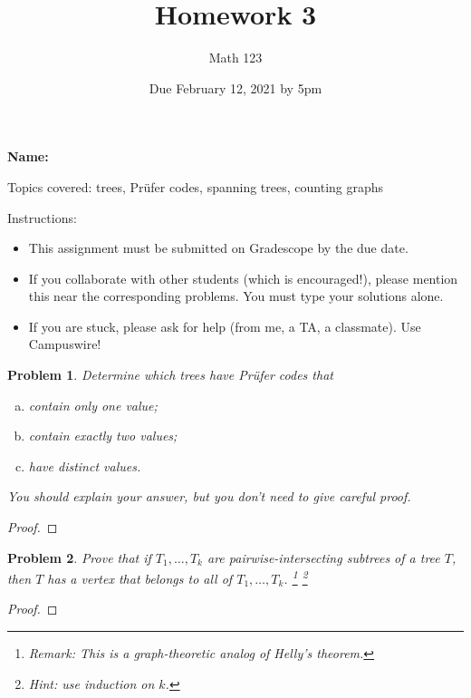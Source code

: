 \documentclass[11pt]{article}
\author{Math 123}
\date{Due February 12, 2021 by 5pm}
\title{Homework 3}
\newtheorem{problem}{Problem}
\begin{document}
\maketitle

{\bf\Large Name:} 


\vspace{.3in}
Topics covered: trees, Pr\"ufer codes, spanning trees, counting graphs

Instructions: 
\begin{itemize}
\item This assignment must be submitted on Gradescope by the due date. 
\item If you collaborate with other students (which is encouraged!), please mention this near the corresponding problems. You must type your solutions alone. 
\item If you are stuck, please ask for help (from me, a TA, a classmate). Use Campuswire!  
\end{itemize}
\pagebreak 



\begin{problem}
Determine which trees have Pr\"ufer codes that 
\begin{enumerate}[(a)]
\item contain only one value;
\item contain exactly two values;
\item have distinct values. 
\end{enumerate} 
You should explain your answer, but you don't need to give careful proof. 
\end{problem}

\begin{proof}

\end{proof}


\begin{problem}
Prove that if $T_1,\ldots,T_k$ are pairwise-intersecting subtrees of a tree $T$, then $T$ has a vertex that belongs to all of $T_1,\ldots,T_k$. \footnote{Remark: This is a graph-theoretic analog of Helly's theorem.} \footnote{Hint: use induction on $k$.}
\end{problem}

\begin{proof}

\end{proof}
\end{document}
